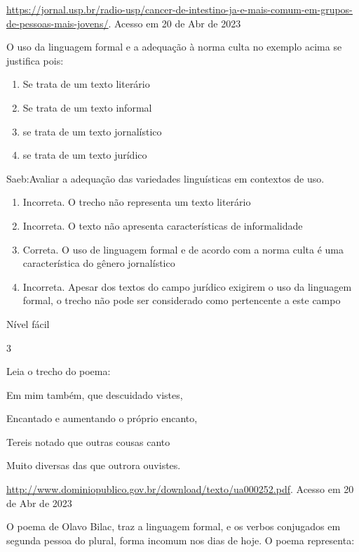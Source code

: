 {{\begin{itemize}
\begin{itemize}
\href{https://jornal.usp.br/radio-usp/cancer-de-intestino-ja-e-mais-comum-em-grupos-de-pessoas-mais-jovens/}{\uline{https://jornal.usp.br/radio-usp/cancer-de-intestino-ja-e-mais-comum-em-grupos-de-pessoas-mais-jovens/}}.
Acesso em 20 de Abr de 2023

O uso da linguagem formal e a adequação à norma culta no exemplo acima
se justifica pois:

\begin{enumerate}
\def\labelenumi{\alph{enumi})}
\item
  Se trata de um texto literário
\item
  Se trata de um texto informal
\item
  se trata de um texto jornalístico
\item
  se trata de um texto jurídico
\end{enumerate}

Saeb:Avaliar a adequação das variedades linguísticas em contextos de
uso.

\begin{enumerate}
\def\labelenumi{\arabic{enumi}.}
\item
  Incorreta. O trecho não representa um texto literário
\item
  Incorreta. O texto não apresenta características de informalidade
\item
  Correta. O uso de linguagem formal e de acordo com a norma culta é uma
  característica do gênero jornalístico
\item
  Incorreta. Apesar dos textos do campo jurídico exigirem o uso da
  linguagem formal, o trecho não pode ser considerado como pertencente a
  este campo
\end{enumerate}

Nível fácil

\num{3}

Leia o trecho do poema:

Em mim também, que descuidado vistes,

Encantado e aumentando o próprio encanto,

Tereis notado que outras cousas canto

Muito diversas das que outrora ouvistes.

\href{http://www.dominiopublico.gov.br/download/texto/ua000252.pdf}{\uline{http://www.dominiopublico.gov.br/download/texto/ua000252.pdf}}.
Acesso em 20 de Abr de 2023

O poema de Olavo Bilac, traz a linguagem formal, e os verbos conjugados
em segunda pessoa do plural, forma incomum nos dias de hoje. O poema
representa:


\end{itemize}
\end{itemize}}}
